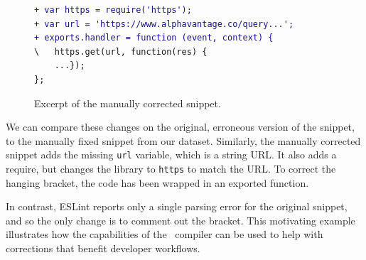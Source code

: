 \documentclass[conference]{IEEEtran}
\begin{document}
\begin{figure}[h]
    \centering
    \begin{lstlisting}[language=diff]
+ var https = require('https');
+ var url = 'https://www.alphavantage.co/query...';
+ exports.handler = function (event, context) {
\   https.get(url, function(res) {
    ...});
};
    \end{lstlisting}
    \caption{Excerpt of the manually corrected snippet.}
    \label{fig:motivating_manual}
\end{figure}

We can compare these changes on the original, erroneous version of the snippet, to the manually fixed snippet from our dataset. Similarly, the manually corrected snippet adds the missing \texttt{url} variable, which is a string URL. It also adds a require, but changes the library to \texttt{https} to match the URL. To correct the hanging bracket, the code has been wrapped in an exported function.

In contrast, ESLint reports only a single parsing error for the original snippet, and so the only change is to comment out the bracket. This motivating example illustrates how the capabilities of the \ts\ compiler can be used to help with corrections that benefit developer workflows.



\end{document}
